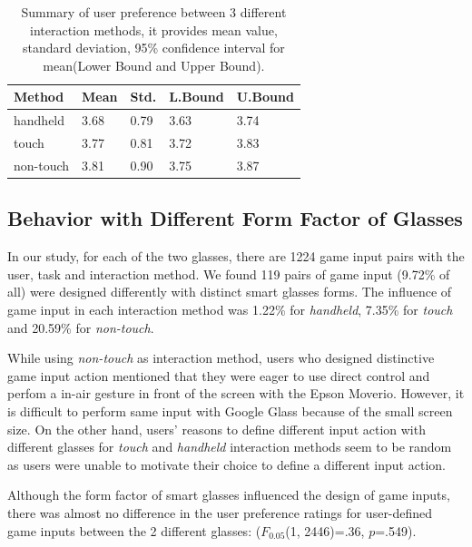 \documentclass{sigchi}
\newcommand\tabhead[1]{\small\textbf{#1}}
\begin{document}
  \begin{table}
    \centering
    \begin{tabular}{|l|l|l|l|l|}
      \hline
      \tabhead{Method} &
      \multicolumn{1}{|p{0.13\columnwidth}|}{\centering\tabhead{Mean}} &
      \multicolumn{1}{|p{0.13\columnwidth}|}{\centering\tabhead{Std.}} &
      \multicolumn{1}{|p{0.13\columnwidth}|}{\centering\tabhead{L.Bound}} &
      \multicolumn{1}{|p{0.13\columnwidth}|}{\centering\tabhead{U.Bound}} \\
      \hline
      handheld & 3.68 & 0.79 & 3.63 & 3.74\\
      \hline
      touch & 3.77 & 0.81 & 3.72 & 3.83\\
      \hline
      non-touch & 3.81 & 0.90 & 3.75 & 3.87\\
      \hline

    

    \end{tabular}
    \caption{Summary of user preference between 3 different interaction methods, it provides mean value, standard deviation, 95\% confidence interval for mean(Lower Bound and Upper Bound).}
    \label{tab:tablePreferenceInteractionMethod}
  \end{table}

  \subsection{Behavior with Different Form Factor of Glasses}
  In our study, for each of the two glasses, there are 1224 game input pairs with the user, task and interaction method. We found 119 pairs of game input (9.72\% of all) were designed differently with distinct smart glasses forms. The influence of game input in each interaction method was 1.22\% for \emph{handheld}, 7.35\% for \emph{touch} and 20.59\% for \emph{non-touch}.

  While using \emph{non-touch} as interaction method, users who designed distinctive game input action mentioned that they were eager to use direct control and perfom a in-air gesture in front of the screen with the Epson Moverio. However, it is difficult to perform same input with Google Glass because of the small screen size. On the other hand, users' reasons to define different input action with different glasses for \emph{touch} and \emph{handheld} interaction methods seem to be random as users were unable to motivate their choice to define a different input action.

  Although the form factor of smart glasses influenced the design of game inputs, there was almost no difference in the user preference ratings for user-defined game inputs between the 2 different glasses: ($F_{0.05}$(1, 2446)=.36, $p$=.549).
\end{document}
